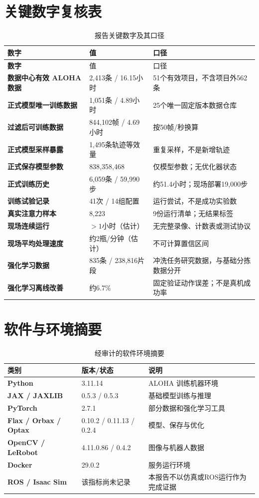 \section{关键数字复核表}

\begin{longtable}{>{\bfseries}p{50mm}p{28mm}p{47mm}}
\caption{报告关键数字及其口径}\\
\toprule
数字 & 值 & 口径\\
\midrule\endfirsthead
\toprule
数字 & 值 & 口径\\
\midrule\endhead
数据中心有效 ALOHA 数据 & 2,413条 / 16.15小时 & 51个有效项目，不含项目外562条\\
正式模型唯一训练数据 & 1,051条 / 4.89小时 & 25个唯一固定版本数据仓库\\
过滤后可训练数据 & 844,102帧 / 4.69小时 & 按50帧/秒换算\\
正式模型采样暴露 & 1,495条轨迹等效量 & 重复采样，不是新增轨迹\\
正式保存模型参数 & 838,358,468 & 仅模型参数；无优化器状态\\
正式训练历史 & 6,059条 / 59,990步 & 约51.4小时；现场部署19,000步\\
训练试验记录 & 41次 / 14组配置 & 运行尝试，不是成功实验数\\
真实注意力样本 & 8,223 & 9份运行清单；无结果标签\\
现场连续运行 & $>1$小时（估计） & 无完整录像、计数表或测试协议\\
现场平均处理速度 & 约2瓶/分钟（估计） & 不可计算置信区间\\
强化学习数据 & 835条 / 238,816片段 & 冲洗任务研究数据，与基础分拣数据分开\\
强化学习离线改善 & 约6.7\% & 固定验证动作误差；不是真机成功率\\
\bottomrule
\end{longtable}

\section{软件与环境摘要}

\begin{table}[H]
\centering
\caption{经审计的软件环境摘要}
\begin{tabularx}{\textwidth}{>{\bfseries}p{33mm}p{35mm}X}
\toprule
类别 & 版本/状态 & 说明\\
\midrule
Python & 3.11.14 & ALOHA 训练机器环境\\
JAX / JAXLIB & 0.5.3 / 0.5.3 & 基础模型训练与推理\\
PyTorch & 2.7.1 & 部分数据和强化学习工具\\
Flax / Orbax / Optax & 0.10.2 / 0.11.13 / 0.2.4 & 模型、保存与优化\\
OpenCV / LeRobot & 4.11.0.86 / 0.4.2 & 图像与机器人数据\\
Docker & 29.0.2 & 服务运行环境\\
ROS / Isaac Sim & 该指标尚未记录 & 本报告不以仿真或ROS运行作为完成证据\\
\bottomrule
\end{tabularx}
\end{table}


